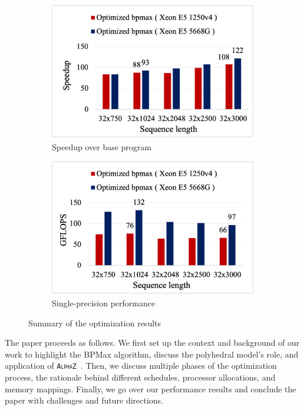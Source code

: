 \documentclass[conference]{IEEEtran}
\newcommand{\alphaz}{\textsc{\texttt{AlphaZ}}}
\begin{document}
\begin{figure}[htbp]
\centering
\begin{subfigure}[htbp]{0.49\linewidth}
\centering
\includegraphics[scale=0.52, trim=4 4 4 4,clip]{figure_highlight_speed_up2.png}
\caption{Speedup over base program}
\label{fig:quick_speedup}
\end{subfigure}
\begin{subfigure}[htbp]{0.49\linewidth}
\centering
\includegraphics[scale=0.52, trim=4 4 4 4,clip]{figure_highlight_perf2.png}
\caption{Single-precision performance}
\label{fig:quick_performance}
\end{subfigure}
\caption{Summary of the optimization results}
\label{fig:bpm_quick_compare}
\end{figure}

The paper proceeds as follows. We first set up the context and background of our work to highlight the BPMax algorithm, discuss the polyhedral model's role, and application of \alphaz\ . Then, we discuss multiple phases of the optimization process, the rationale behind different schedules, processor allocations, and memory mappings. Finally, we go over our performance results and conclude the paper with challenges and future directions.
\end{document}
